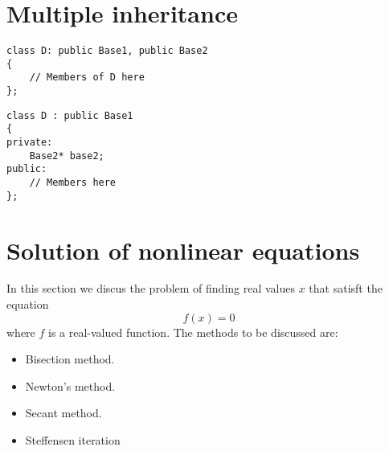 \section{Multiple inheritance}

\begin{lstlisting}
class D: public Base1, public Base2
{
	// Members of D here
};
\end{lstlisting}

\begin{lstlisting}
class D : public Base1
{
private:
	Base2* base2;
public:
	// Members here
};
\end{lstlisting}

\section{Solution of nonlinear equations}

In this section we discus the problem of finding real values $x$ that satisft the equation \[ f\left(x\right)=0 \] where $f$ is a real-valued function. The methods to be discussed are:
\begin{itemize}
	\item Bisection method.
	\item Newton's method.
	\item Secant method.
	\item Steffensen iteration
\end{itemize}

